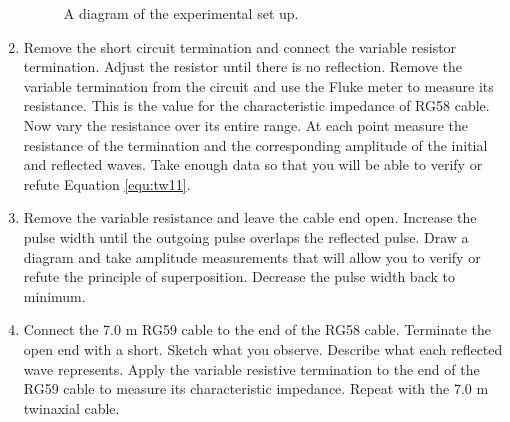 \begin{enumerate}
\begin{figure}
\caption{A diagram of the experimental set up.}
\label{fig:tw1}
\end{figure}

\item Remove the short circuit termination and connect the variable resistor termination. Adjust the resistor until there is no reflection. Remove the variable termination from the circuit and use the Fluke meter to measure its resistance. This is the value for the characteristic impedance of RG58 cable. Now vary the resistance over its entire range. At each point measure the resistance of the termination and the corresponding amplitude of the initial and reflected waves. Take enough data so that you will be able to verify or refute Equation \ref{equ:tw11}.

\item Remove the variable resistance and leave the cable end open. Increase the pulse width until the outgoing pulse overlaps the reflected pulse. Draw a diagram and take amplitude measurements that will allow you to verify or refute the principle of superposition. Decrease the pulse width back to minimum.

\item Connect the 7.0 m RG59 cable to the end of the RG58 cable. Terminate the open end with a short. Sketch what you observe. Describe what each reflected wave represents. Apply the variable resistive termination to the end of the RG59 cable to measure its characteristic impedance. Repeat with the 7.0 m twinaxial cable. %


\end{enumerate}

